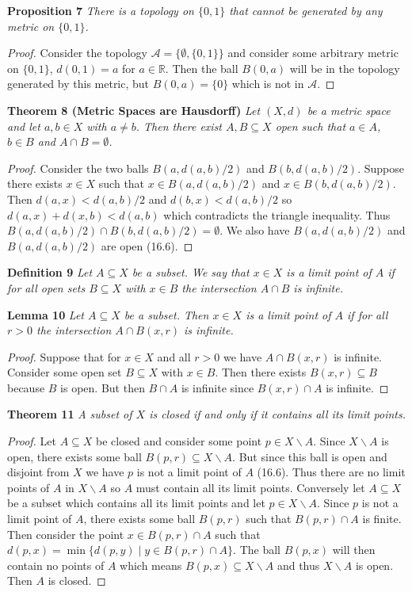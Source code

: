 \documentclass{article}
\begin{document}
\begin{flushleft}
\textbf{Proposition 7}
\textsl{There is a topology on $\{0,1\}$ that cannot be generated by any metric on $\{0,1\}$.}
\begin{proof}
Consider the topology $\mathcal{A} = \{\emptyset, \{0,1\}\}$ and consider some arbitrary metric on $\{0,1\}$, $d(0,1) = a$ for $a \in \mathbb{R}$. Then the ball $B(0,a)$ will be in the topology generated by this metric, but $B(0,a) = \{0\}$ which is not in $\mathcal{A}$.
\end{proof}

\textbf{Theorem 8 (Metric Spaces are Hausdorff)}
\textsl{Let $(X,d)$ be a metric space and let $a,b \in X$ with $a \neq b$. Then there exist $A, B \subseteq X$ open such that $a \in A$, $b \in B$ and $A \cap B = \emptyset$.}
\begin{proof}
Consider the two balls $B(a, d(a,b)/2)$ and $B(b, d(a,b)/2)$. Suppose there exists $x \in X$ such that $x \in B(a, d(a,b)/2)$ and $x \in B(b, d(a,b)/2)$. Then $d(a,x) < d(a,b)/2$ and $d(b,x) < d(a,b)/2$ so $d(a,x) + d(x,b) < d(a,b)$ which contradicts the triangle inequality. Thus $B(a, d(a,b)/2) \cap B(b, d(a,b)/2) = \emptyset$. We also have $B(a, d(a,b)/2)$ and $B(a, d(a,b)/2)$ are open (16.6).
\end{proof}

\textbf{Definition 9}
\textsl{Let $A \subseteq X$ be a subset. We say that $x \in X$ is a limit point of $A$ if for all open sets $B \subseteq X$ with $x \in B$ the intersection $A \cap B$ is infinite.}\newline

\textbf{Lemma 10}
\textsl{Let $A \subseteq X$ be a subset. Then $x \in X$ is a limit point of $A$ if for all $r>0$ the intersection $A \cap B(x,r)$ is infinite.}
\begin{proof}
Suppose that for $x \in X$ and all $r > 0$ we have $A \cap B(x,r)$ is infinite. Consider some open set $B \subseteq X$ with $x \in B$. Then there exists $B(x,r) \subseteq B$ because $B$ is open. But then $B \cap A$ is infinite since $B(x,r) \cap A$ is infinite.
\end{proof}

\textbf{Theorem 11}
\textsl{A subset of $X$ is closed if and only if it contains all its limit points.}
\begin{proof}
Let $A \subseteq X$ be closed and consider some point $p \in X \backslash A$. Since $X \backslash A$ is open, there exists some ball $B(p, r) \subseteq X \backslash A$. But since this ball is open and disjoint from $X$ we have $p$ is not a limit point of $A$ (16.6). Thus there are no limit points of $A$ in $X \backslash A$ so $A$ must contain all its limit points. Conversely let $A \subseteq X$ be a subset which contains all its limit points and let $p \in X \backslash A$. Since $p$ is not a limit point of $A$, there exists some ball $B(p,r)$ such that $B(p,r) \cap A$ is finite. Then consider the point $x \in B(p,r) \cap A$ such that $d(p,x) = \min \{d(p,y) \mid y \in B(p,r) \cap A\}$. The ball $B(p,x)$ will then contain no points of $A$ which means $B(p,x) \subseteq X \backslash A$ and thus $X \backslash A$ is open. Then $A$ is closed.
\end{proof}


\end{flushleft}
\end{document}
